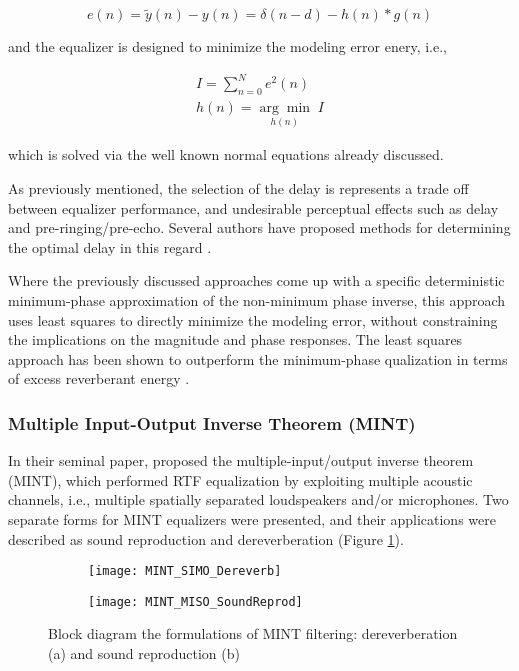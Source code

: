 \begin{equation}
	e(n) = \tilde{y}(n)  - y(n) = \delta(n-d) - h(n)*g(n)
\end{equation}

\noindent
and the equalizer is designed to minimize the modeling error enery, i.e.,

\begin{eqnarray}
I = \sum_{n=0}^{N}e^2(n) \\
h(n) = \underset{h(n)}{\arg\min}\;I
\end{eqnarray}

\noindent
which is solved via the well known normal equations already discussed.

As previously mentioned, the selection of the delay is represents a trade off between equalizer performance, and undesirable perceptual effects such as delay and pre-ringing/pre-echo. Several authors have proposed methods for determining the optimal delay in this regard \citep{clarkson1985spectral, ford1978optimum}.

Where the previously discussed approaches come up with a specific deterministic minimum-phase approximation of the non-minimum phase inverse, this approach uses least squares to directly minimize the modeling error, without constraining the implications on the magnitude and phase responses. The least squares approach has been shown to outperform the minimum-phase qualization in terms of excess reverberant energy \citep{mourjopoulos1982comparative}.


\subsubsection{Multiple Input-Output Inverse Theorem (MINT)} \label{MINT}

In their seminal paper, \cite{miyoshi1986inverse} proposed the multiple-input/output inverse theorem (MINT), which performed RTF equalization by exploiting multiple acoustic channels, i.e., multiple spatially separated loudspeakers and/or microphones. Two separate forms for MINT equalizers were presented, and their applications were described as sound reproduction and dereverberation (Figure \ref{fig:MINT_Structures}).

\begin{figure}[H]
	\centering
	\begin{subfigure}[b]{0.49\textwidth}
		\centering
		\texttt{[image: MINT\_SIMO\_Dereverb]}
		\subcaption{} 
	\end{subfigure}
	\hfill
	\begin{subfigure}[b]{0.49\textwidth}
		\centering
		\texttt{[image: MINT\_MISO\_SoundReprod]}
		\subcaption{} 
	\end{subfigure}
	\caption[Block diagram for the MISO and SIMO formulations of MINT filtering]{Block diagram the formulations of MINT filtering: dereverberation (a) and sound reproduction (b)}
	\label{fig:MINT_Structures}
\end{figure}

